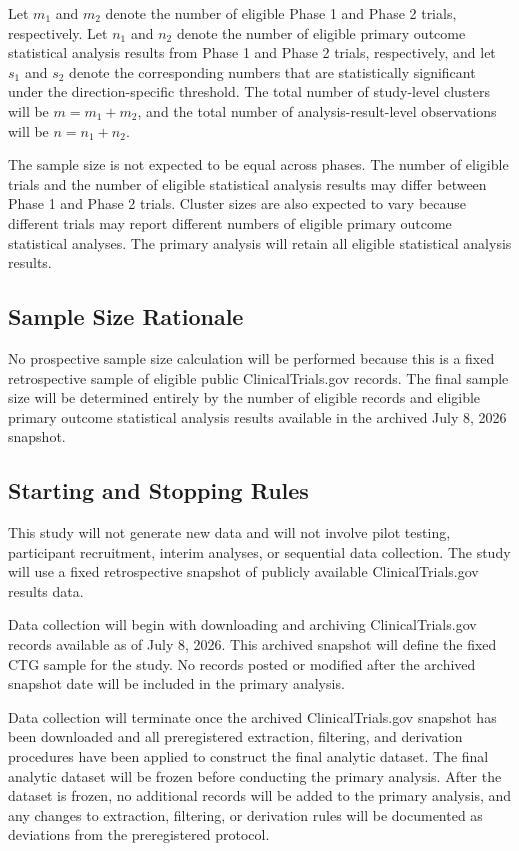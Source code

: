 \documentclass[11pt]{article}
\begin{document}
Let \(m_1\) and \(m_2\) denote the number of eligible Phase 1 and Phase 2 trials, respectively. Let \(n_1\) and \(n_2\) denote the number of eligible primary outcome statistical analysis results from Phase 1 and Phase 2 trials, respectively, and let \(s_1\) and \(s_2\) denote the corresponding numbers that are statistically significant under the direction-specific threshold. The total number of study-level clusters will be \(m = m_1 + m_2\), and the total number of analysis-result-level observations will be \(n = n_1 + n_2\).

The sample size is not expected to be equal across phases. The number of eligible trials and the number of eligible statistical analysis results may differ between Phase 1 and Phase 2 trials. Cluster sizes are also expected to vary because different trials may report different numbers of eligible primary outcome statistical analyses. The primary analysis will retain all eligible statistical analysis results.

\subsection{Sample Size Rationale}

No prospective sample size calculation will be performed because this is a fixed retrospective sample of eligible public ClinicalTrials.gov records. The final sample size will be determined entirely by the number of eligible records and eligible primary outcome statistical analysis results available in the archived July 8, 2026 snapshot.

\subsection{Starting and Stopping Rules}

This study will not generate new data and will not involve pilot testing, participant recruitment, interim analyses, or sequential data collection. The study will use a fixed retrospective snapshot of publicly available ClinicalTrials.gov results data.

Data collection will begin with downloading and archiving ClinicalTrials.gov records available as of July 8, 2026. This archived snapshot will define the fixed CTG sample for the study. No records posted or modified after the archived snapshot date will be included in the primary analysis.

Data collection will terminate once the archived ClinicalTrials.gov snapshot has been downloaded and all preregistered extraction, filtering, and derivation procedures have been applied to construct the final analytic dataset. The final analytic dataset will be frozen before conducting the primary analysis. After the dataset is frozen, no additional records will be added to the primary analysis, and any changes to extraction, filtering, or derivation rules will be documented as deviations from the preregistered protocol.
\end{document}
